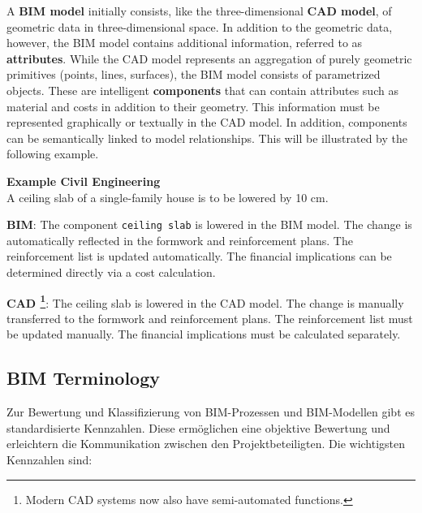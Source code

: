 \begin{English}
    A \textbf{BIM model} initially consists, like the three-dimensional \textbf{CAD model}, of geometric data in three-dimensional space. In addition to the geometric data, however, the BIM model contains additional information, referred to as \textbf{attributes}. While the CAD model represents an aggregation of purely geometric primitives (points, lines, surfaces), the BIM model consists of parametrized objects. These are intelligent \textbf{components} that can contain attributes such as material and costs in addition to their geometry. This information must be represented graphically or textually in the CAD model. In addition, components can be semantically linked to model relationships. This will be illustrated by the following example. \cite{astourLehrbuchGrundlagenBIMArbeitsmethode2022} \\

    \begin{itshape}
    \textbf{Example Civil Engineering}\\
    A ceiling slab of a single-family house is to be lowered by 10 cm.

    \textbf{BIM}: The component \texttt{ceiling slab} is lowered in the BIM model. The change is automatically reflected in the formwork and reinforcement plans. The reinforcement list is updated automatically. The financial implications can be determined directly via a cost calculation.

    \textbf{CAD \footnote{Modern CAD systems now also have semi-automated functions.}}: The ceiling slab is lowered in the CAD model. The change is manually transferred to the formwork and reinforcement plans. The reinforcement list must be updated manually. The financial implications must be calculated separately.
    \end{itshape}
 

\end{English}

\subsection{BIM Terminology}
\begin{German}
    Zur Bewertung und Klassifizierung von BIM-Prozessen und BIM-Modellen gibt es standardisierte Kennzahlen. Diese ermöglichen eine objektive Bewertung und erleichtern die Kommunikation zwischen den Projektbeteiligten. Die wichtigsten Kennzahlen sind:
\end{German}

